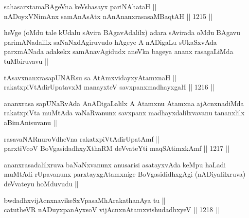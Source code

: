 \begin{shl}
sahasarxtamaBAgeVna keVshasayx pariNAhataH || \\
nADoyxV\s NimAnx samAnAsAtx nAnAnanxrasasaMBaqtAH ||  1215 ||  
\end{shl}

\begin{artha}
heVge (oMdu tale kUdalu sAvira BAgavAdalilx) adara sAvirada oMdu BAgavu parimANadalilx saNaNxdAgiruvudo hAgeye A nADigaLu sUkaSxvAda parxmANada adakekx samAnavAgidudx aneVka bageya ananx rasagaLiMda tuMbiruvavu ||
\end{artha}


\begin{shl}
tAsavxnanxrasapUNARsu sa AtAmx\s vidayxyA\s \s tamxnaH || \\
rakatxpiVtAdirUpatavxM manayxteV savxpanxmadhayxgaH ||  1216 ||  
\end{shl}

\begin{artha}
ananxrasa sapUNaRvAda AnADigaLalilx A Atamxnu Atamxna ajAcnxnadiMda rakatxpiVta muMtAda vaNaRvanunx savxpanx madhayxdalilxvavanu tananxlilx aBimAnisuvanu ||
\end{artha}

\begin{shl}
rasavaNARnuroVdheVna rakatxpiVtAdirUpatAmf || \\
parxtiVcoV BoVgasidadhxyXthaRM deVvateYti maqSAtimxkAmf ||  1217 ||  
\end{shl}

\begin{artha}
ananxrasadalilxruva baNaNxvanunx anusarisi asatayxvAda keMpu haLadi muMtAdi rUpavanunx parxtayxgAtamxnige BoVgasididhxgAgi (nADiyalilxruva) deVvateyu hoMduvudu ||
\end{artha}


\begin{shl}
bwdadhxvijAcnxnavikeSxVpasaMhArakathanAya tu || \\
catutheVR nADuyxpanAyxsoV vijAcnxnAtamxvishudadhxyeV ||  1218 ||  
\end{shl}


